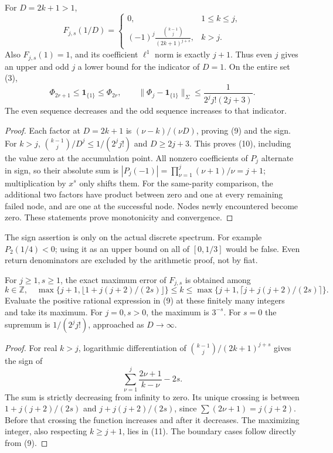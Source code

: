 \begin{theorem}\label{thm:filters}
For $D=2k+1>1$,
\[
 F_{j,s}(1/D)=
 \begin{cases}
 0,&1\le k\le j,\\
 (-1)^j\displaystyle\frac{\binom{k-1}{j}}{(2k+1)^{j+s}},&k>j.
 \end{cases}
 \tag{9}
\]
Also $F_{j,s}(1)=1$, and its coefficient $\ell^1$ norm is exactly $j+1$.
Thus even $j$ gives an upper and odd $j$ a lower bound for the indicator of $D=1$.
On the entire set (3),
\[
 \boxed{\Phi_{2r+1}\le\mathbf1_{\{1\}}\le\Phi_{2r},\qquad
 \|\Phi_j-\mathbf1_{\{1\}}\|_\Sigma
 \le\frac1{2^j j!(2j+3)}.}
 \tag{10}
\]
The even sequence decreases and the odd sequence increases to that indicator.
\end{theorem}
\begin{proof}
Each factor at $D=2k+1$ is $(\nu-k)/(\nu D)$, proving (9) and the sign.
For $k>j$,
$\binom{k-1}{j}/D^j\le1/(2^j j!)$ and $D\ge2j+3$.
This proves (10), including the value zero at the accumulation point.
All nonzero coefficients of $P_j$ alternate in sign, so their absolute sum is
$|P_j(-1)|=\prod_{\nu=1}^j(\nu+1)/\nu=j+1$; multiplication by $x^s$ only
shifts them. For the same-parity comparison, the additional two factors
have product between zero and one at every remaining failed node, and are
one at the successful node. Nodes newly encountered become zero. These
statements prove monotonicity and convergence.
\end{proof}

The sign assertion is only on the actual discrete spectrum. For example
$P_2(1/4)<0$; using it as an upper bound on all of $[0,1/3]$ would be false.
Even return denominators are excluded by the arithmetic proof, not by fiat.

\begin{theorem}\label{thm:sharp}
For $j\ge1,s\ge1$, the exact maximum error of $F_{j,s}$ is obtained among
\[
 k\in\mathbb Z,\quad
 \max\{j+1,\lfloor1+j(j+2)/(2s)\rfloor\}
 \le k\le
 \max\{j+1,\lceil j+j(j+2)/(2s)\rceil\}.
 \tag{11}
\]
Evaluate the positive rational expression in (9) at these finitely many
integers and take its maximum. For $j=0,s>0$, the maximum is $3^{-s}$.
For $s=0$ the supremum is $1/(2^j j!)$, approached as $D\to\infty$.
\end{theorem}
\begin{proof}
For real $k>j$, logarithmic differentiation of
$\binom{k-1}{j}/(2k+1)^{j+s}$ gives the sign of
\[
 \sum_{\nu=1}^j\frac{2\nu+1}{k-\nu}-2s.
\]
The sum is strictly decreasing from infinity to zero. Its unique crossing is
between $1+j(j+2)/(2s)$ and $j+j(j+2)/(2s)$, since
$\sum(2\nu+1)=j(j+2)$. Before that crossing the function increases and after it
decreases. The maximizing integer, also respecting $k\ge j+1$, lies in (11).
The boundary cases follow directly from (9).
\end{proof}


